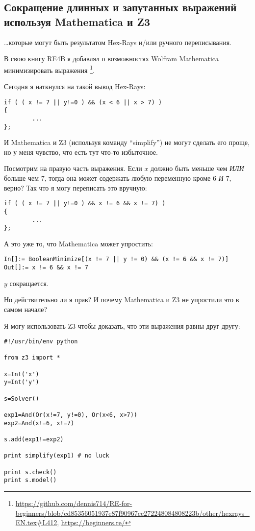 \subsection{Сокращение длинных и запутанных выражений используя Mathematica и Z3}

\dots которые могут быть результатом Hex-Rays и/или ручного переписывания.

В свою книгу RE4B я добавлял о возможностях Wolfram Mathematica минимизировать выражения
\footnote{\url{https://github.com/dennis714/RE-for-beginners/blob/cd85356051937e87f90967cc272248084808223b/other/hexrays_EN.tex\#L412}, \url{https://beginners.re/}}.

Сегодня я наткнулся на такой вывод Hex-Rays:

\begin{lstlisting}
if ( ( x != 7 || y!=0 ) && (x < 6 || x > 7) )
{
        ...
};
\end{lstlisting}

И Mathematica и Z3 (используя команду ``simplify'') не могут сделать его проще, но у меня чувство, что есть тут что-то
избыточное.

Посмотрим на правую часть выражения.
Если $x$ должно быть меньше чем \textit{ИЛИ} больше чем 7, тогда она может содержать любую переменную кроме 6 \textit{И} 7, верно?
Так что я могу переписать это вручную:

\begin{lstlisting}
if ( ( x != 7 || y!=0 ) && x != 6 && x != 7) )
{
        ...
};
\end{lstlisting}

А это уже то, что Mathematica может упростить:

\begin{lstlisting}
In[]:= BooleanMinimize[(x != 7 || y != 0) && (x != 6 && x != 7)]
Out[]:= x != 6 && x != 7
\end{lstlisting}

$y$ сокращается.

Но действительно ли я прав?
И почему Mathematica и Z3 не упростили это в самом начале?

Я могу использовать Z3 чтобы доказать, что эти выражения равны друг другу:

\begin{lstlisting}
#!/usr/bin/env python

from z3 import *

x=Int('x')
y=Int('y')

s=Solver()

exp1=And(Or(x!=7, y!=0), Or(x<6, x>7))
exp2=And(x!=6, x!=7)

s.add(exp1!=exp2)

print simplify(exp1) # no luck

print s.check()
print s.model()
\end{lstlisting}

